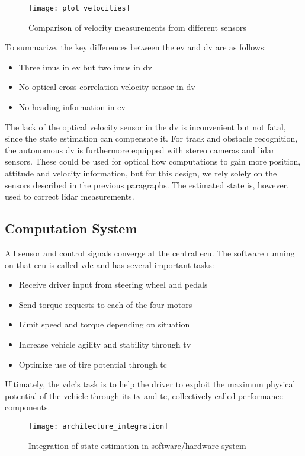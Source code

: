 \begin{figure}
	\centering
	\texttt{[image: plot\_velocities]}%
	\caption{Comparison of velocity measurements from different sensors}
	\label{fig:velocities}
\end{figure}

To summarize, the key differences between the \gls{ev} and \gls{dv} are as follows:
\begin{itemize}
\item Three \glspl{imu} in \gls{ev} but two \glspl{imu} in \gls{dv}
\item No optical cross-correlation velocity sensor in \gls{dv}
\item No heading information in \gls{ev}
\end{itemize}
The lack of the optical velocity sensor in the \gls{dv} is inconvenient but not fatal, since the state estimation can compensate it. For track and obstacle recognition, the autonomous \gls{dv} is furthermore equipped with stereo cameras and lidar sensors. These could be used for optical flow computations to gain more position, attitude and velocity information, but for this design, we rely solely on the sensors described in the previous paragraphs. The estimated state is, however, used to correct lidar measurements.


\subsection{Computation System}\label{sec:design-computation-system}
All sensor and control signals converge at the central \gls{ecu}. The software running on that \gls{ecu} is called \gls{vdc} and has several important tasks:
\begin{itemize}
\item Receive driver input from steering wheel and pedals
\item Send torque requests to each of the four motors
\item Limit speed and torque depending on situation
\item Increase vehicle agility and stability through \gls{tv}
\item Optimize use of tire potential through \gls{tc}
\end{itemize}
Ultimately, the \gls{vdc}'s task is to help the driver to exploit the maximum physical potential of the vehicle through its \gls{tv} and \gls{tc}, collectively called performance components.

\begin{figure}
	\centering
	\texttt{[image: architecture\_integration]}%
	\caption{Integration of state estimation in software/hardware system}
	\label{fig:architecture-integration}
\end{figure}

